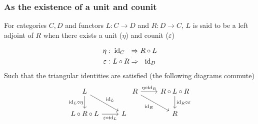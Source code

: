 \subsubsection*{As the existence of a unit and counit}
For categories $C,D$ and functors $L: C\to D$ and $R: D\to C$, $L$ is said to
be a left adjoint of $R$ when there exists a unit ($\eta$) and counit
($\varepsilon$)

\begin{equation*}
  \begin{aligned}
    \eta&:\\
    \varepsilon&:
  \end{aligned}
  \ \begin{aligned}
    \mathrm{id}_C\ \ &\Rightarrow R \circ L\\
    L \circ R &\Rightarrow\ \ \mathrm{id}_D
  \end{aligned}
\end{equation*}
Such that the triangular identities are satisfied (the following diagrams commute)
\[\begin{tikzcd}
	L \\
	{L\circ R\circ L} & L
	\arrow["{\id_L\circ\eta}"', from=1-1, to=2-1]
	\arrow["{\varepsilon\circ \id_L}"', from=2-1, to=2-2]
	\arrow["{\id_L}", from=1-1, to=2-2]
\end{tikzcd}
\begin{tikzcd}
	R & {R\circ L\circ R} \\
	& R
	\arrow["{\eta\circ\id_R}", from=1-1, to=1-2]
	\arrow["{\id_R \circ \varepsilon}", from=1-2, to=2-2]
	\arrow["{\id_R}"', from=1-1, to=2-2]
\end{tikzcd}\]

